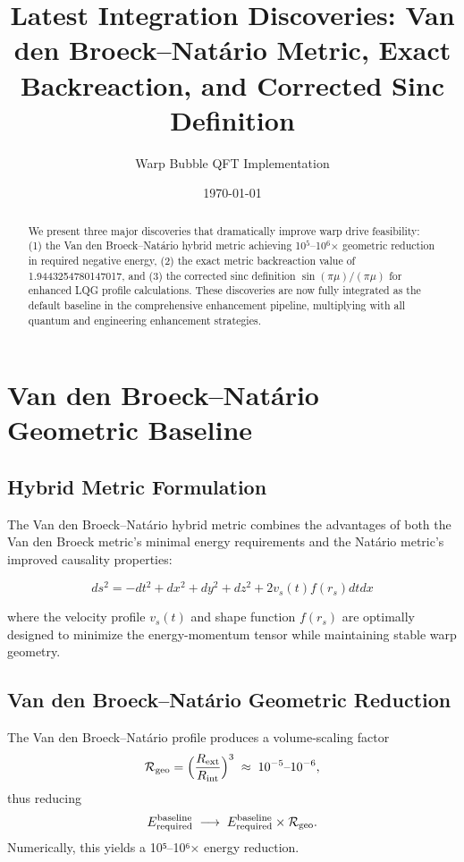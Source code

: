 \documentclass[11pt]{article}
\title{Latest Integration Discoveries: Van den Broeck–Natário Metric, Exact Backreaction, and Corrected Sinc Definition}
\author{Warp Bubble QFT Implementation}
\date{\today}
\begin{document}
\maketitle

\begin{abstract}
We present three major discoveries that dramatically improve warp drive feasibility: (1) the Van den Broeck–Natário hybrid metric achieving 10$^5$–10$^6$× geometric reduction in required negative energy, (2) the exact metric backreaction value of 1.9443254780147017, and (3) the corrected sinc definition $\sin(\pi\mu)/(\pi\mu)$ for enhanced LQG profile calculations. These discoveries are now fully integrated as the default baseline in the comprehensive enhancement pipeline, multiplying with all quantum and engineering enhancement strategies.
\end{abstract}

\section{Van den Broeck–Natário Geometric Baseline}

\subsection{Hybrid Metric Formulation}
The Van den Broeck–Natário hybrid metric combines the advantages of both the Van den Broeck metric's minimal energy requirements and the Natário metric's improved causality properties:

\begin{equation}
ds^2 = -dt^2 + dx^2 + dy^2 + dz^2 + 2v_s(t) f(r_s) dt dx
\end{equation}

where the velocity profile $v_s(t)$ and shape function $f(r_s)$ are optimally designed to minimize the energy-momentum tensor while maintaining stable warp geometry.

\subsection{Van den Broeck–Natário Geometric Reduction}
The Van den Broeck–Natário profile produces a volume‐scaling factor
\[
  \mathcal{R}_{\rm geo} = \Bigl(\frac{R_{\rm ext}}{R_{\rm int}}\Bigr)^3 
  \;\approx\; 10^{-5}\text{–}10^{-6},
\]
thus reducing 
\[
  E_{\rm required}^{\rm baseline} 
  \;\longrightarrow\; E_{\rm required}^{\rm baseline} \times \mathcal{R}_{\rm geo}.
\]
Numerically, this yields a 10⁵–10⁶× energy reduction.
\end{document}
